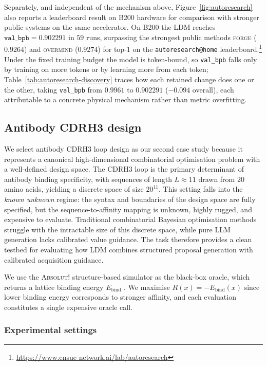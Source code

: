 Separately, and independent of the mechanism above, Figure~\ref{fig:autoresearch} also reports a leaderboard result on B200 hardware for comparison with stronger public systems on the same accelerator. On B200 the LDM reaches $\texttt{val\_bpb}=0.902291$ in $59$ runs, surpassing the strongest public methods \textsc{forge} ($0.9264$) and \textsc{overmind} ($0.9274$) for top-1 on the \texttt{autoresearch@home} leaderboard.\footnote{\url{https://www.ensue-network.ai/lab/autoresearch}} Under the fixed training budget the model is token-bound, so \texttt{val\_bpb} falls only by training on more tokens or by learning more from each token; Table~\ref{tab:autoresearch-discovery} traces how each retained change does one or the other, taking \texttt{val\_bpb} from $0.9961$ to $0.902291$ ($-0.094$ overall), each attributable to a concrete physical mechanism rather than metric overfitting.


\subsection{Antibody CDRH3 design}
\label{sec:cs-antibody-results}

We select antibody CDRH3 loop design as our second case study because it represents a canonical high-dimensional combinatorial optimisation problem with a well-defined design space. The CDRH3 loop is the primary determinant of antibody binding specificity, with sequences of length \(L \approx 11\) drawn from 20 amino acids, yielding a discrete space of size \(20^{11}\). This setting falls into the \emph{known unknown} regime: the syntax and boundaries of the design space are fully specified, but the sequence-to-affinity mapping is unknown, highly rugged, and expensive to evaluate. Traditional combinatorial Bayesian optimisation methods struggle with the intractable size of this discrete space, while pure LLM generation lacks calibrated value guidance. The task therefore provides a clean testbed for evaluating how LDM combines structured proposal generation with calibrated acquisition guidance.

We use the \textsc{Absolut!} structure-based simulator as the black-box oracle, which returns a lattice binding energy \(E_{\mathrm{bind}}\) \citep{khan2022antbo}. We maximise \(R(x) = -E_{\mathrm{bind}}(x)\) since lower binding energy corresponds to stronger affinity, and each evaluation constitutes a single expensive oracle call.

\subsubsection{Experimental settings}

